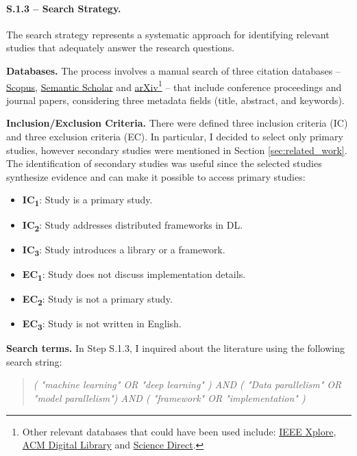 \paragraph{S.1.3 -- Search Strategy.}
The search strategy represents a systematic approach for identifying relevant studies that
adequately answer the research questions.

\textbf{Databases.}
The process involves a manual search of three citation databases --
\href{https://www.scopus.com/}{Scopus}, \href{https://www.semanticscholar.org/}{Semantic Scholar}
and \href{https://arxiv.org/}{arXiv}\footnote{Other relevant databases that could have been used
	include: \href{https://ieeexplore.ieee.org/}{IEEE Xplore}, \href{https://dl.acm.org/}{ACM Digital
		Library} and \href{https://www.sciencedirect.com/}{Science Direct}.} -- that include conference
proceedings and journal papers, considering three metadata fields (title, abstract, and keywords).

\textbf{Inclusion/Exclusion Criteria.}
There were defined three inclusion criteria (IC) and three exclusion criteria (EC). In particular, I
decided to select only primary studies, however secondary studies were mentioned in Section
\ref{sec:related_work}. The identification of secondary studies was useful since the selected
studies synthesize evidence and can make it possible to access primary studies:

\begin{itemize}
	\item \textbf{IC\textsubscript{1}}: Study is a primary study.
	\item \textbf{IC\textsubscript{2}}: Study addresses distributed frameworks in DL.
	\item \textbf{IC\textsubscript{3}}: Study introduces a library or a framework. \\
	\item \textbf{EC\textsubscript{1}}: Study does not discuss implementation details.
	\item \textbf{EC\textsubscript{2}}: Study is not a primary study.
	\item \textbf{EC\textsubscript{3}}: Study is not written in English.
\end{itemize}

\textbf{Search terms.}
In Step S.1.3, I inquired about the literature using the following search string:
\begin{quote}
	\textit{( "machine learning" OR "deep learning" )
		AND
		( "Data parallelism" OR "model parallelism")
		AND
		( "framework" OR "implementation" )}
\end{quote}

